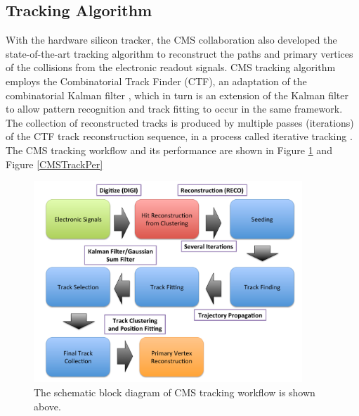 \iffalse

\subsection{Tracking Algorithm}

With the hardware silicon tracker, the CMS collaboration also developed the state-of-the-art tracking algorithm to reconstruct the paths and primary vertices of the collisions from the electronic readout signals. CMS tracking algorithm employs the Combinatorial Track Finder (CTF), an adaptation of the combinatorial Kalman filter \cite{CMSTrack1,CMSTrack2,CMSTrack3}, which in turn is an extension of the Kalman filter \cite{Kalman} to allow pattern recognition and track fitting to occur in the same framework. The collection of reconstructed tracks is produced by multiple passes (iterations) of the CTF track reconstruction sequence, in a process called iterative tracking \cite{CMSTrackComp}. The CMS tracking workflow and its performance are shown in Figure \ref{TrackWorkFlow} and Figure \ref{CMSTrackPer}

\begin{figure}[hbtp]
\begin{center}
\includegraphics[width=0.90\textwidth]{Figures/Chapter2/TrackWF.pdf}
\caption{The schematic block diagram of CMS tracking workflow is shown above.}
\label{TrackWorkFlow}
\end{center}
\end{figure} 



